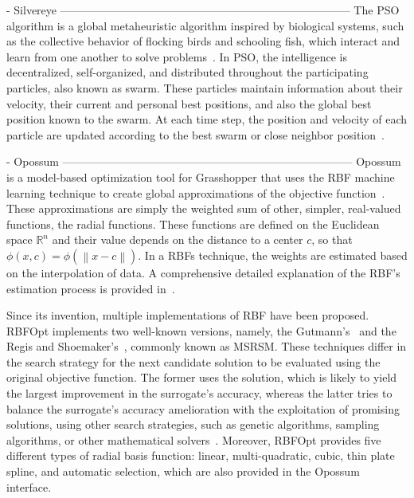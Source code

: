 - Silvereye ------------------------------------------------------------------------------
The \ac{PSO} algorithm is a global metaheuristic algorithm inspired by biological systems, such as the collective behavior of flocking birds and schooling fish, which interact and learn from one another to solve problems~\cite{Brownlee2011}. In \ac{PSO}, the intelligence is decentralized, self-organized, and distributed throughout the participating particles, also known as swarm. These particles maintain information about their velocity, their current and personal best positions, and also the global best position known to the swarm. At each time step, the position and velocity of each particle are updated according to the best swarm or close neighbor position~\cite{Brownlee2011}.

- Opossum ------------------------------------------------------------------------------
Opossum is a model-based optimization tool for Grasshopper that uses the \ac{RBF} machine learning technique to create global approximations of the objective function~\cite{Forrester2009SBO}. These approximations are simply the weighted sum of other, simpler, real-valued functions, the radial functions. These functions are defined on the Euclidean space $\mathbb{R}^n$ and their value depends on the distance to a center $c$, so that $\phi(x, c) = \phi(\left\lVert x-c \right\rVert)$. In a \acp{RBF} technique, the weights are estimated based on the interpolation of data. A comprehensive detailed explanation of the \ac{RBF}'s estimation process is provided in~\cite{Forrester2009SBO}. 

Since its invention, multiple implementations of \ac{RBF} have been proposed. RBFOpt implements two well-known versions, namely, the Gutmann's~\cite{Gutmann2001} and the Regis and Shoemaker's~\cite{Regis2007}, commonly known as MSRSM. These techniques differ in the search strategy for the next candidate solution to be evaluated using the original objective function. The former uses the solution, which is likely to yield the largest improvement in the surrogate's accuracy, whereas the latter tries to balance the surrogate's accuracy amelioration with the exploitation of promising solutions, using other search strategies, such as genetic algorithms, sampling algorithms, or other mathematical solvers~\cite{Wortmann2017Opossum}. Moreover, RBFOpt provides five different types of radial basis function: linear, multi-quadratic, cubic, thin plate spline, and automatic selection, which are also provided in the Opossum interface.

